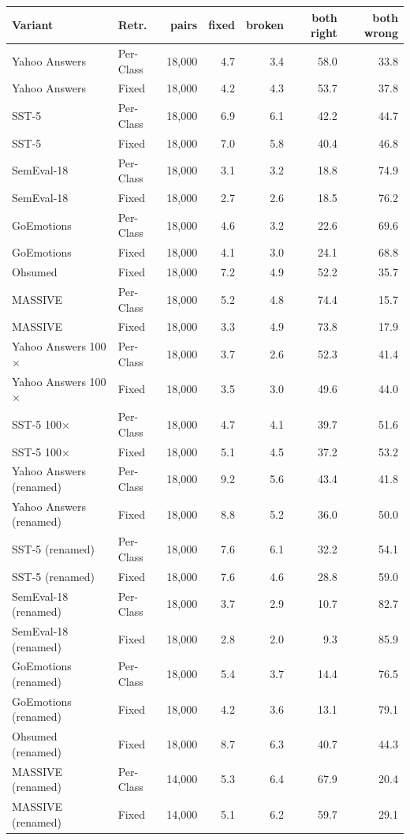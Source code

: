 \begin{tabular}{llrrrrr}
\toprule
Variant & Retr. & pairs & fixed & broken & both right & both wrong \\
\midrule
Yahoo Answers & Per-Class & 18,000 & 4.7 & 3.4 & 58.0 & 33.8 \\
Yahoo Answers & Fixed & 18,000 & 4.2 & 4.3 & 53.7 & 37.8 \\
SST-5 & Per-Class & 18,000 & 6.9 & 6.1 & 42.2 & 44.7 \\
SST-5 & Fixed & 18,000 & 7.0 & 5.8 & 40.4 & 46.8 \\
SemEval-18 & Per-Class & 18,000 & 3.1 & 3.2 & 18.8 & 74.9 \\
SemEval-18 & Fixed & 18,000 & 2.7 & 2.6 & 18.5 & 76.2 \\
GoEmotions & Per-Class & 18,000 & 4.6 & 3.2 & 22.6 & 69.6 \\
GoEmotions & Fixed & 18,000 & 4.1 & 3.0 & 24.1 & 68.8 \\
Ohsumed & Fixed & 18,000 & 7.2 & 4.9 & 52.2 & 35.7 \\
MASSIVE & Per-Class & 18,000 & 5.2 & 4.8 & 74.4 & 15.7 \\
MASSIVE & Fixed & 18,000 & 3.3 & 4.9 & 73.8 & 17.9 \\
Yahoo Answers 100$\times$ & Per-Class & 18,000 & 3.7 & 2.6 & 52.3 & 41.4 \\
Yahoo Answers 100$\times$ & Fixed & 18,000 & 3.5 & 3.0 & 49.6 & 44.0 \\
SST-5 100$\times$ & Per-Class & 18,000 & 4.7 & 4.1 & 39.7 & 51.6 \\
SST-5 100$\times$ & Fixed & 18,000 & 5.1 & 4.5 & 37.2 & 53.2 \\
Yahoo Answers (renamed) & Per-Class & 18,000 & 9.2 & 5.6 & 43.4 & 41.8 \\
Yahoo Answers (renamed) & Fixed & 18,000 & 8.8 & 5.2 & 36.0 & 50.0 \\
SST-5 (renamed) & Per-Class & 18,000 & 7.6 & 6.1 & 32.2 & 54.1 \\
SST-5 (renamed) & Fixed & 18,000 & 7.6 & 4.6 & 28.8 & 59.0 \\
SemEval-18 (renamed) & Per-Class & 18,000 & 3.7 & 2.9 & 10.7 & 82.7 \\
SemEval-18 (renamed) & Fixed & 18,000 & 2.8 & 2.0 & 9.3 & 85.9 \\
GoEmotions (renamed) & Per-Class & 18,000 & 5.4 & 3.7 & 14.4 & 76.5 \\
GoEmotions (renamed) & Fixed & 18,000 & 4.2 & 3.6 & 13.1 & 79.1 \\
Ohsumed (renamed) & Fixed & 18,000 & 8.7 & 6.3 & 40.7 & 44.3 \\
MASSIVE (renamed) & Per-Class & 14,000 & 5.3 & 6.4 & 67.9 & 20.4 \\
MASSIVE (renamed) & Fixed & 14,000 & 5.1 & 6.2 & 59.7 & 29.1 \\
\bottomrule
\end{tabular}
